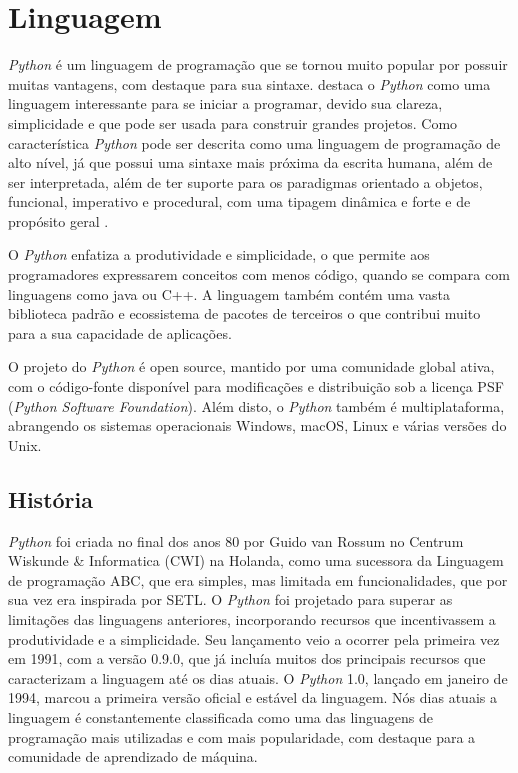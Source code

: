 \chapter{Linguagem}
\indent \textit{Python} é um linguagem de programação que se tornou muito popular por possuir muitas vantagens, com destaque para sua sintaxe. \cite{menezes2010introduccao} destaca o \textit{Python} como uma linguagem interessante para se iniciar a programar, devido sua clareza, simplicidade e que pode ser usada para construir grandes projetos. Como característica \textit{Python} pode ser descrita como uma linguagem de programação de alto nível, já que possui uma sintaxe mais próxima da escrita humana, além de ser interpretada, além de ter suporte para os paradigmas orientado a objetos, funcional, imperativo e procedural, com uma tipagem dinâmica e forte e de propósito geral \cite{wiki:python}.

O \textit{Python} enfatiza a produtividade e simplicidade, o que permite aos programadores expressarem conceitos com menos código, quando se compara com linguagens como java ou C++. A linguagem também contém uma vasta biblioteca padrão e ecossistema de pacotes de terceiros o que contribui muito para a sua capacidade de aplicações.\cite{wiki:python}

O projeto do \textit{Python} é open source, mantido por uma comunidade global ativa, com o código-fonte disponível para modificações e distribuição sob a licença PSF (\textit{Python Software Foundation}). Além disto, o \textit{Python} também é multiplataforma, abrangendo os sistemas operacionais Windows, macOS, Linux e várias versões do Unix.\cite{wiki:python}

\section{História}

\indent \textit{Python} foi criada no final dos anos 80 por Guido van Rossum no Centrum Wiskunde \& Informatica (CWI) na Holanda, como uma sucessora da Linguagem de programação ABC, que era simples, mas limitada em funcionalidades, que por sua vez era inspirada por SETL. O \textit{Python} foi projetado para superar as limitações das linguagens anteriores, incorporando recursos que incentivassem a produtividade e a simplicidade. Seu lançamento veio a ocorrer pela primeira vez em 1991, com a versão 0.9.0, que já incluía muitos dos principais recursos que caracterizam a linguagem até os dias atuais. O \textit{Python} 1.0, lançado em janeiro de 1994, marcou a primeira versão oficial e estável da linguagem.\cite{wiki:python}  Nós dias atuais a linguagem é constantemente classificada como uma das linguagens de programação mais utilizadas e com mais popularidade, com destaque para a comunidade de aprendizado de máquina. \cite{wiki:python}